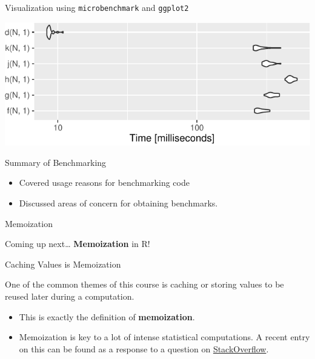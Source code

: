 \begin{frame}[fragile]{Visualization using \texttt{microbenchmark} and
\texttt{ggplot2}}

\begin{Shaded}
\begin{Highlighting}[]
\end{Highlighting}
\end{Shaded}

\includegraphics{lec5_functions_recursion_memoization_benchmarking_files/figure-beamer/compare_ggplot2-1.pdf}

\end{frame}

\begin{frame}{Summary of Benchmarking}

\begin{itemize}
\tightlist
\item
  Covered usage reasons for benchmarking code
\item
  Discussed areas of concern for obtaining benchmarks.
\end{itemize}

\end{frame}

\begin{frame}{Memoization}

Coming up next\ldots{} \textbf{Memoization} in R!

\end{frame}

\begin{frame}{Caching Values is Memoization}

One of the common themes of this course is caching or storing values to
be reused later during a computation.

\begin{itemize}
\item
  This is exactly the definition of \textbf{memoization}.
\item
  Memoization is key to a lot of intense statistical computations. A
  recent entry on this can be found as a response to a question on
  \href{http://stackoverflow.com/a/36973875/1345455}{StackOverflow}.
\end{itemize}

\end{frame}

